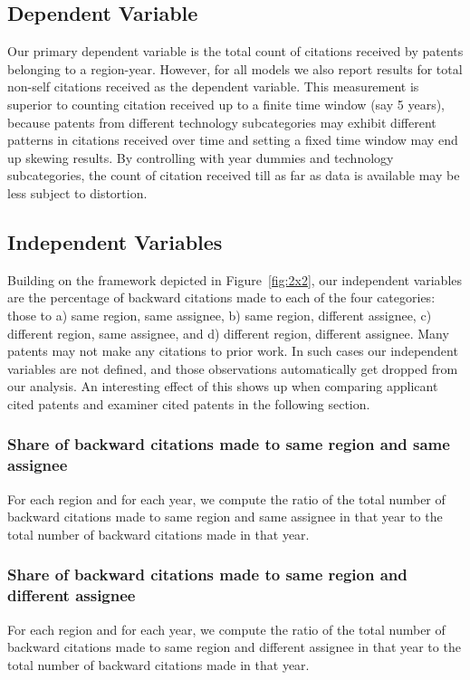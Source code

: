 \documentclass[12pt,letterpaper]{article}
\begin{document}
\subsection{Dependent Variable}
Our primary dependent variable is the  total count of citations received by patents belonging to a region-year. However, for all models we also report results for total non-self citations received as the dependent variable. This measurement is superior to counting citation received up to a finite time window (say 5 years), because patents from different technology subcategories may exhibit different patterns in citations received over time and setting a fixed time window may end up skewing results. By controlling with year dummies and technology subcategories, the count of citation received till as far as data is available may be less subject to distortion.

\subsection{Independent Variables}
Building on the framework depicted in Figure~\ref{fig:2x2}, our independent variables are the percentage of backward citations made to each of the four categories: those to a) same region, same assignee, b) same region, different assignee, c) different region, same assignee, and d) different region, different assignee. Many patents may not make any citations to prior work. In such cases our independent variables are not defined, and those observations automatically get dropped from our analysis. An interesting effect of this shows up when comparing applicant cited patents and examiner cited patents in the following section. \par
\subsubsection{Share of backward citations made to same region and same assignee}
For each region and for each year, we compute the ratio of the total number of backward citations made to same region and same assignee in that year to the total number of backward citations made in that year.
\subsubsection{Share of backward citations made to same region and different assignee}
For each region and for each year, we compute the ratio of the total number of backward citations made to same region and different assignee in that year to the total number of backward citations made in that year.
\end{document}
